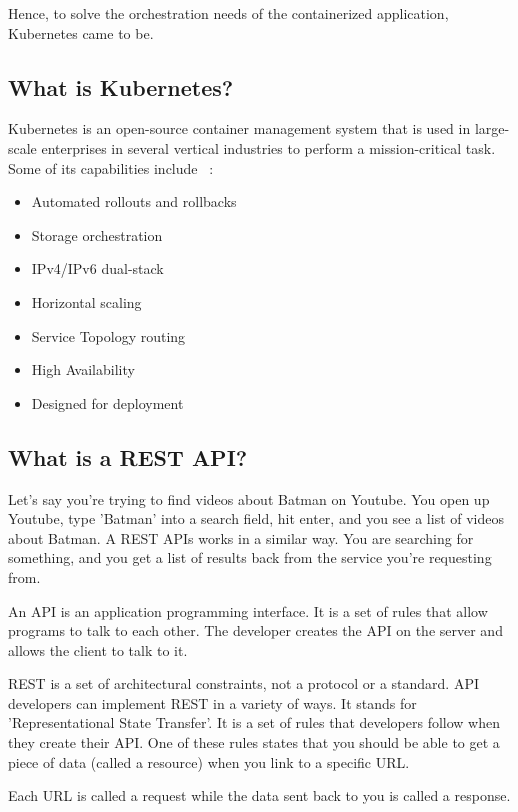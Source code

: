 \documentclass[]{IEEEtran}
\begin{document}
      Hence, to solve the orchestration needs of the containerized application, Kubernetes came to be. ~\cite{kubernetesMedium}
      
      \subsection{What is Kubernetes?}
      Kubernetes is an open-source container management system that is used in large-scale enterprises in several vertical industries to perform a mission-critical task. Some of its capabilities include ~\cite{kubernetesio}:
\begin{itemize}
    \item Automated rollouts and rollbacks
    \item Storage orchestration
\item IPv4/IPv6 dual-stack
\item Horizontal scaling
\item Service Topology routing
\item High Availability
\item Designed for deployment
\end{itemize}

\subsection{What is a REST API?}
Let's say you're trying to find videos about Batman on Youtube. You open up Youtube, type 'Batman' into a search field, hit enter, and you see a list of videos about Batman. A REST APIs works in a similar way. You are searching for something, and you get a list of results back from the service you're requesting from.

An API is an application programming interface. It is a set of rules that allow programs to talk to each other. The developer creates the API on the server and allows the client to talk to it.

REST is a set of architectural constraints, not a protocol or a standard. API developers can implement REST in a variety of ways. It stands for 'Representational State Transfer'. It is a set of rules that developers follow when they create their API. One of these rules states that you should be able to get a piece of data (called a resource) when you link to a specific URL.

Each URL is called a request while the data sent back to you is called a response. ~\cite{restapiMedium}~\cite{restapiRedHat}
\end{document}
